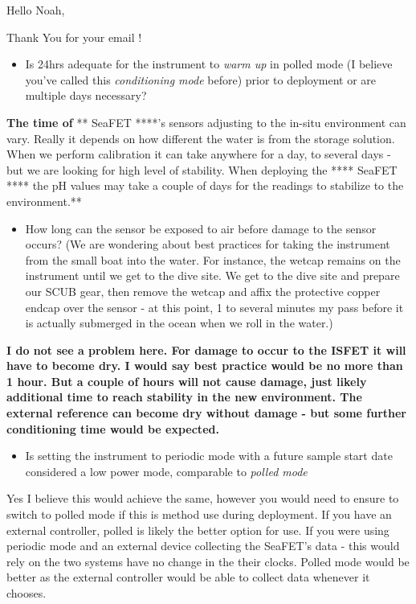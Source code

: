 \documentclass[
]{book}
\providecommand{\tightlist}{%
  \setlength{\itemsep}{0pt}\setlength{\parskip}{0pt}}
\begin{document}
Hello Noah,

Thank You for your email !

\begin{itemize}
\tightlist
\item
  Is 24hrs adequate for the instrument to \emph{warm up} in polled mode (I believe you've called this \emph{conditioning mode} before) prior to deployment or are multiple days necessary?
\end{itemize}

\textbf{The time of }** SeaFET ****'s sensors adjusting to the in-situ environment can vary. Really it depends on how different the water is from the storage solution.
When we perform calibration it can take anywhere for a day, to several days - but we are looking for high level of stability.
When deploying the **** SeaFET **** the pH values may take a couple of days for the readings to stabilize to the environment.**

\begin{itemize}
\tightlist
\item
  How long can the sensor be exposed to air before damage to the sensor occurs? (We are wondering about best practices for taking the instrument from the small boat into the water. For instance, the wetcap remains on the instrument until we get to the dive site. We get to the dive site and prepare our SCUB gear, then remove the wetcap and affix the protective copper endcap over the sensor - at this point, 1 to several minutes my pass before it is actually submerged in the ocean when we roll in the water.)
\end{itemize}

\textbf{I do not see a problem here. For damage to occur to the ISFET it will have to become dry. I would say best practice would be no more than 1 hour. But a couple of hours will not cause damage, just likely additional time to reach stability in the new environment. The external reference can become dry without damage - but some further conditioning time would be expected.}

\begin{itemize}
\tightlist
\item
  Is setting the instrument to periodic mode with a future sample start date considered a low power mode, comparable to \emph{polled mode}
\end{itemize}

Yes I believe this would achieve the same, however you would need to ensure to switch to polled mode if this is method use during deployment.
If you have an external controller, polled is likely the better option for use. If you were using periodic mode and an external device collecting the SeaFET's data - this would rely on the two systems have no change in the their clocks. Polled mode would be better as the external controller would be able to collect data whenever it chooses.
\end{document}
